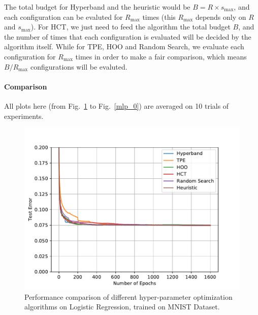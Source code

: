 \documentclass[runningheads,a4paper]{llncs}
\begin{document}
The total budget for Hyperband and the heuristic would be $B = R\times s_{\max}$, and each configuration can be evaluted for $R_{\max}$ times (this $R_{\max}$ depends only on $R$ and $s_{\max}$). For HCT, we just need to feed the algorithm the total budget $B$, and the number of times that each configuration is evaluated will be decided by the algorithm itself. While for TPE, HOO and Random Search, we  evaluate each configuration for $R_{\max}$ times in order to make a fair comparison, which means $B/R_{\max}$ configurations will be evaluted.

\paragraph{\textbf{Comparison}}
All plots here (from Fig.~\ref{logistic_1} to Fig.~\ref{mlp_0}) are averaged on 10 trials of experiments.

\begin{figure}[ht]
    \centering
    \includegraphics[scale=0.8]{img/mnist/logistic_1.pdf}
    \caption{Performance comparison of different hyper-parameter optimization algorithms on Logistic Regression, trained on MNIST Dataset.}
    \label{logistic_1}
\end{figure}
\end{document}
